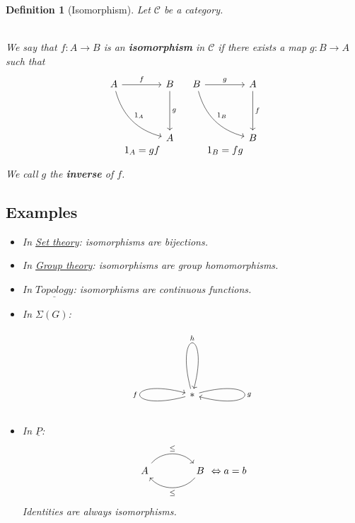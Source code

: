 \documentclass{article}
\newtheorem{definition}{Definition}[section]
\begin{document}
    \begin{definition}[Isomorphism]
        Let $\mathcal{C}$ be a category.

        \\

        We say that $f: A \to B$ is an \textbf{isomorphism} in $\mathcal{C}$ if there exists a map
        $g: B \to A$ such that
        \[
            \begin{array}{c c} %
                \begin{tikzcd}[column sep=4em, row sep=4em]
                    A  \arrow[r, "f"] \arrow[dr, bend right, "1_A"]
                    & B  \arrow[d, "g"]\\
                    & A
                \end{tikzcd}
                &
                \begin{tikzcd}[column sep=4em, row sep=4em]
                    B  \arrow[r, "g"] \arrow[dr, bend right, "1_B"]
                    & A  \arrow[d, "f"]\\
                    & B
                \end{tikzcd} \\
                \text{$1_A = gf$} & \text{$1_B = fg$}
            \end{array}
        \]

        We call $g$ the \textbf{inverse} of $f$.

        \subsection{Examples}

        \begin{itemize}
            \item In \underline{Set theory}: isomorphisms are bijections.
            \item In \underline{Group theory}: isomorphisms are group homomorphisms.
            \item In $\underline{Topology}$: isomorphisms are continuous functions.
            \item In $\Sigma(G)$:
            \[
                \begin{tikzcd}[scale=4.5]
                    * \arrow[loop left, "f"] \arrow[loop right, "g"] \arrow[loop above, "h"]
                \end{tikzcd}
            \]
            \item In $\underline{P}$:
            \[
                \begin{tikzcd}[column sep=4em, row sep=4em]
                    A \arrow[r, bend left=50, "\leq"]
                    & B \arrow[l, bend left=50, "\leq"]
                \end{tikzcd} \Leftrightarrow a = b
            \]
            Identities are always isomorphisms.
        \end{itemize}


\end{definition}
\end{document}
